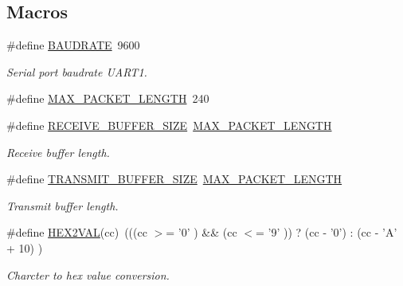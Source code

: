 \subsection*{Macros}
\begin{DoxyCompactItemize}
\item 
\#define \hyperlink{a00031_a734bbab06e1a9fd2e5522db0221ff6e3}{B\+A\+U\+D\+R\+A\+T\+E}~9600
\begin{DoxyCompactList}\small\item\em Serial port baudrate U\+A\+R\+T1. \end{DoxyCompactList}\item 
\#define \hyperlink{a00031_a973c680573b37fc359fc68d0707da355}{M\+A\+X\+\_\+\+P\+A\+C\+K\+E\+T\+\_\+\+L\+E\+N\+G\+T\+H}~240
\item 
\#define \hyperlink{a00031_aa49ab378520c95fea987f93a7f3c9abf}{R\+E\+C\+E\+I\+V\+E\+\_\+\+B\+U\+F\+F\+E\+R\+\_\+\+S\+I\+Z\+E}~\hyperlink{a00031_a973c680573b37fc359fc68d0707da355}{M\+A\+X\+\_\+\+P\+A\+C\+K\+E\+T\+\_\+\+L\+E\+N\+G\+T\+H}
\begin{DoxyCompactList}\small\item\em Receive buffer length. \end{DoxyCompactList}\item 
\#define \hyperlink{a00031_aef714b16a48390956c10e8aa18d156b8}{T\+R\+A\+N\+S\+M\+I\+T\+\_\+\+B\+U\+F\+F\+E\+R\+\_\+\+S\+I\+Z\+E}~\hyperlink{a00031_a973c680573b37fc359fc68d0707da355}{M\+A\+X\+\_\+\+P\+A\+C\+K\+E\+T\+\_\+\+L\+E\+N\+G\+T\+H}
\begin{DoxyCompactList}\small\item\em Transmit buffer length. \end{DoxyCompactList}\item 
\#define \hyperlink{a00031_a428b04d2e2f2da2ea031a6c731660a71}{H\+E\+X2\+V\+A\+L}(cc)~(((cc $>$= '0' ) \&\& (cc $<$= '9' )) ? (cc -\/ '0') \+: (cc -\/ 'A' + 10) )
\begin{DoxyCompactList}\small\item\em Charcter to hex value conversion. \end{DoxyCompactList}\end{DoxyCompactItemize}
